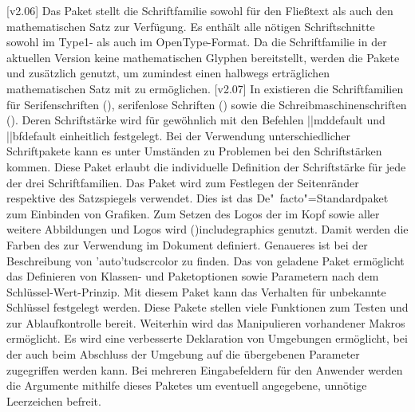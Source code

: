 \begin{DeclarePackages}
[v2.06]
  Das Paket  stellt die Schriftfamilie \OpenSans sowohl für 
  den Fließtext als auch den mathematischen Satz zur Verfügung. Es enthält alle 
  nötigen Schriftschnitte sowohl im Type1- als auch im OpenType-Format. Da die 
  Schriftfamilie in der aktuellen Version keine mathematischen Glyphen 
  bereitstellt, werden die Pakete  und  
  zusätzlich genutzt, um zumindest einen halbwegs erträglichen mathematischen 
  Satz mit \OpenSans zu ermöglichen.
  [v2.07]
  In  existieren die Schriftfamilien für Serifenschriften 
  (), serifenlose Schriften () sowie die 
  Schreibmaschinenschriften (). Deren Schriftstärke wird für 
  gewöhnlich mit den Befehlen \Macro||{mddefault} und \Macro||{bfdefault} 
  einheitlich festgelegt. Bei der Verwendung unterschiedlicher Schriftpakete 
  kann es unter Umständen zu Problemen bei den Schriftstärken kommen. Diese 
  Paket erlaubt die individuelle Definition der Schriftstärke für jede der drei 
  Schriftfamilien.
  Das Paket wird zum Festlegen der Seitenränder respektive des Satzspiegels 
  verwendet.
  Dies ist das De"~facto"=Standardpaket zum Einbinden von Grafiken. Zum 
  Setzen des Logos der \TnUD im Kopf sowie aller weitere Abbildungen und Logos 
  wird \Macro(){includegraphics} genutzt.
  Damit werden die Farben des \CDs zur Verwendung im Dokument definiert. 
  Genaueres ist bei der Beschreibung von \Package'auto'{tudscrcolor} zu finden. 
  Das von  geladene Paket  ermöglicht das 
  Definieren von Klassen- und Paketoptionen sowie Parametern nach dem 
  Schlüssel-Wert-Prinzip. Mit diesem Paket kann das Verhalten für unbekannte 
  Schlüssel festgelegt werden.
  Diese Pakete stellen viele Funktionen zum Testen und zur Ablaufkontrolle 
  bereit. Weiterhin wird das Manipulieren vorhandener Makros ermöglicht.
  Es wird eine verbesserte Deklaration von Umgebungen ermöglicht, bei der auch 
  beim Abschluss der Umgebung auf die übergebenen Parameter zugegriffen werden 
  kann. 
  Bei mehreren Eingabefeldern für den Anwender werden die Argumente mithilfe 
  dieses Paketes um eventuell angegebene, unnötige Leerzeichen befreit.
\end{DeclarePackages}


